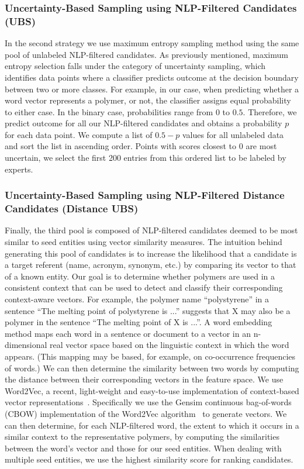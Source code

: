 \subsubsection{Uncertainty-Based Sampling using NLP-Filtered Candidates (UBS)}
In the second strategy we use maximum entropy sampling method using the same pool of unlabeled NLP-filtered candidates.
As previously mentioned, maximum entropy selection falls under the category of uncertainty sampling, which identifies data points where a classifier predicts outcome at the decision boundary between two or more classes. 
For example, in our case, when predicting whether a word vector represents a polymer, or not, the classifier assigns equal probability to either case.
In the binary case, probabilities range from $0$ to $0.5$. Therefore, we predict outcome for all our NLP-filtered candidates and obtains a probability $p$ for each data point. We compute a list of $0.5-p$ values for all unlabeled data and sort the list in ascending order.
Points with scores closest to $0$ are most uncertain, we select the first 200 entries from this ordered list to be labeled by experts.

\subsubsection{Uncertainty-Based Sampling using NLP-Filtered Distance Candidates (Distance UBS)}
Finally, the third pool is composed of NLP-filtered candidates deemed to be most similar to seed entities using vector similarity measures.
The intuition behind generating this pool of candidates is to increase the likelihood that a candidate is a target referent (name, acronym, synonym, etc.) by comparing its vector to that of a known entity.
Our goal is to determine whether polymers are used in a consistent context that can be used to detect and classify their corresponding context-aware vectors.
For example, the polymer name ``polystyrene'' in a sentence ``The
melting point of polystyrene is ...'' suggests that X may also be a polymer in the
sentence ``The melting point of X is ...''.
A word embedding method maps each word
in a sentence or document to a vector in an n-dimensional real vector space
based on the linguistic context in which the word appears. (This mapping may
be based, for example, on co-occurrence frequencies of words.) 
We can then
determine the similarity between two words by computing the distance between
their corresponding vectors in the feature space.
We use Word2Vec, a recent, light-weight and easy-to-use implementation of context-based vector representations~\cite{mikolov2013efficient,mikolov2013distributed}.
Specifically we use the Gensim continuous bag-of-words
(CBOW) implementation of the Word2Vec
algorithm~\cite{rehurek2010software} to generate vectors.
We can then determine, for each NLP-filtered word, the extent to which it occurs
in a similar context to the representative polymers, by computing the similarities
between the word's vector and those for our seed entities. 
When dealing with multiple seed entities, we use the highest similarity score for ranking candidates.

